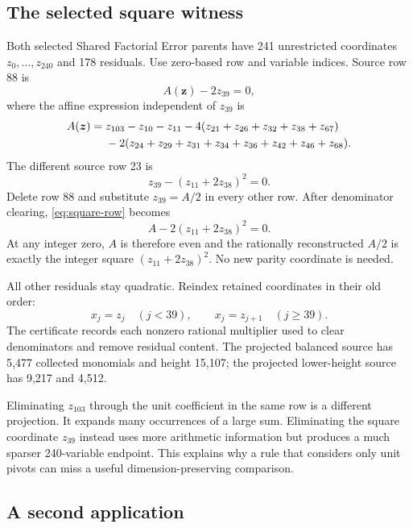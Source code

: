 \documentclass[11pt]{article}
\theoremstyle{remark}\newtheorem{remark}[theorem]{Remark}
\begin{document}
\subsection{The selected square witness}

Both selected Shared Factorial Error parents have 241 unrestricted
coordinates $z_0,\ldots,z_{240}$ and 178 residuals. Use zero-based row and
variable indices. Source row 88 is
\[
A(\boldsymbol z)-2z_{39}=0,
\]
where the affine expression independent of $z_{39}$ is
\begin{align}
A(\boldsymbol z)={}&z_{103}-z_{10}-z_{11}
 -4(z_{21}+z_{26}+z_{32}+z_{38}+z_{67})\notag\\
&-2(z_{24}+z_{29}+z_{31}+z_{34}+z_{36}
      +z_{42}+z_{46}+z_{68}).\label{eq:A}
\end{align}
The different source row 23 is
\begin{equation}\label{eq:square-row}
z_{39}-(z_{11}+2z_{38})^2=0.
\end{equation}
Delete row 88 and substitute $z_{39}=A/2$ in every other row.
After denominator clearing, \eqref{eq:square-row} becomes
\begin{equation}\label{eq:integrality-row}
A-2(z_{11}+2z_{38})^2=0.
\end{equation}
At any integer zero, $A$ is therefore even and the rationally reconstructed
$A/2$ is exactly the integer square $(z_{11}+2z_{38})^2$.
No new parity coordinate is needed.

All other residuals stay quadratic. Reindex retained coordinates in their
old order:
\[
x_j=z_j\quad(j<39),\qquad x_j=z_{j+1}\quad(j\ge39).
\]
The certificate records each nonzero rational multiplier used to clear
denominators and remove residual content. The projected balanced source
has 5,477 collected monomials and height 15,107; the projected lower-height
source has 9,217 and 4,512.

Eliminating $z_{103}$ through the unit coefficient in the same row is a
different projection. It expands many occurrences of a large sum.
Eliminating the square coordinate $z_{39}$ instead uses more arithmetic
information but produces a much sparser 240-variable endpoint.
This explains why a rule that considers only unit pivots can miss a
useful dimension-preserving comparison.

\subsection{A second application}
\end{document}

